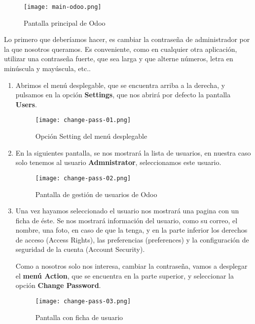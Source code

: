 \begin{figure}[h]
    \centering
    \texttt{[image: main-odoo.png]}
    \caption{Pantalla principal de Odoo}
\end{figure}

Lo primero que deberíamos hacer, es cambiar la contraseña de administrador por la que nosotros queramos. Es conveniente, como en cualquier otra aplicación, utilizar una contraseña fuerte, que sea larga y que alterne números, letra en minúscula y mayúscula, etc..

\begin{enumerate}
    \item Abrimos el menú desplegable, que se encuentra arriba a la derecha, y pulsamos en la opción \textbf{Settings}, que nos abrirá por defecto la pantalla \textbf{Users}.

    \begin{figure}[h]
        \centering
        \texttt{[image: change-pass-01.png]}
        \caption{Opción Setting del menú desplegable}
    \end{figure}

    \item En la siguientes pantalla, se nos mostrará la lista de usuarios, en nuestra caso solo tenemos al usuario \textbf{Admnistrator}, seleccionamos este usuario.

    \begin{figure}[h]
        \centering
        \texttt{[image: change-pass-02.png]}
        \caption{Pantalla de gestión de usuarios de Odoo}
        \label{odoo-users}
    \end{figure}

    \item Una vez hayamos seleccionado el usuario nos mostrará una pagina con un ficha de éste. Se nos mostrará información del usuario, como su correo, el nombre, una foto, en caso de que la tenga, y en la parte inferior los derechos de acceso (Access Rights), las preferencias (preferences) y la configuración de seguridad de la cuenta (Account Security).

    Como a nosotros solo nos interesa, cambiar la contraseña, vamos a desplegar el \textbf{menú Action}, que se encuentra en la parte superior, y seleccionar la opción \textbf{Change Password}.

    \vspace{8ex}

    \begin{figure}[h]
        \centering
        \texttt{[image: change-pass-03.png]}
        \caption{Pantalla con ficha de usuario}
    \end{figure}


\end{enumerate}
